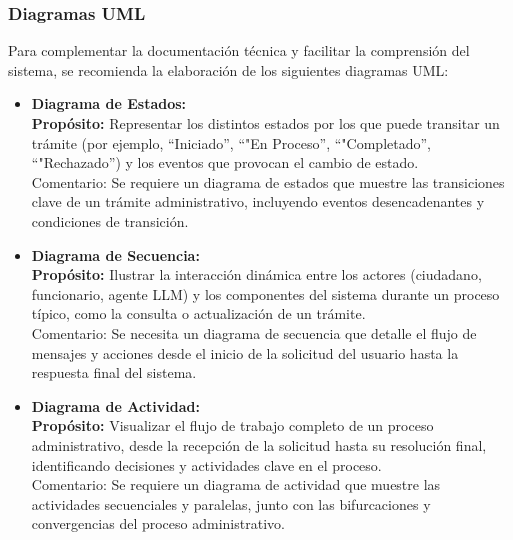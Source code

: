 \subsubsection{Diagramas UML}
Para complementar la documentación técnica y facilitar la comprensión del sistema, se recomienda la elaboración de los siguientes diagramas UML:
\begin{itemize}
    \item \textbf{Diagrama de Estados:} \\
    \textbf{Propósito:} Representar los distintos estados por los que puede transitar un trámite (por ejemplo, ``Iniciado'', ``"En Proceso'', ``"Completado'', ``"Rechazado'') y los eventos que provocan el cambio de estado. \\
    Comentario: Se requiere un diagrama de estados que muestre las transiciones clave de un trámite administrativo, incluyendo eventos desencadenantes y condiciones de transición.
    \item \textbf{Diagrama de Secuencia:} \\
    \textbf{Propósito:} Ilustrar la interacción dinámica entre los actores (ciudadano, funcionario, agente LLM) y los componentes del sistema durante un proceso típico, como la consulta o actualización de un trámite. \\
    Comentario: Se necesita un diagrama de secuencia que detalle el flujo de mensajes y acciones desde el inicio de la solicitud del usuario hasta la respuesta final del sistema.
    \item \textbf{Diagrama de Actividad:} \\
    \textbf{Propósito:} Visualizar el flujo de trabajo completo de un proceso administrativo, desde la recepción de la solicitud hasta su resolución final, identificando decisiones y actividades clave en el proceso. \\
    Comentario: Se requiere un diagrama de actividad que muestre las actividades secuenciales y paralelas, junto con las bifurcaciones y convergencias del proceso administrativo.
\end{itemize}
